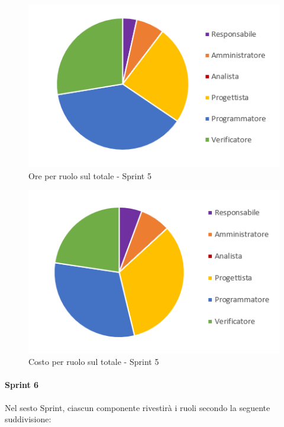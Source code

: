 \begin{figure}[H]
  \centering
  \includegraphics[scale=0.8]{immagini/6Sprint_oreRuolo.png}
  \caption{Ore per ruolo sul totale - Sprint 5}
\end{figure}

\begin{figure}[H]
  \centering
  \includegraphics[scale=0.8]{immagini/6Sprint_costoRuolo.png}
  \caption{Costo per ruolo sul totale - Sprint 5}
\end{figure}

\pagebreak


\paragraph{Sprint 6} \label{paragraph:preventivo_sprint6}
Nel sesto Sprint\glo{}, ciascun componente rivestirà i ruoli secondo la seguente suddivisione:

